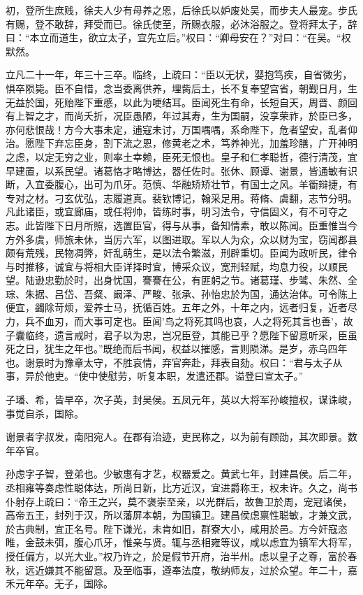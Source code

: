 \documentclass[12pt,UTF8]{ctexbook}
\begin{document}
初，登所生庶贱，徐夫人少有母养之恩，后徐氏以妒废处吴，而步夫人最宠。步氏有赐，登不敢辞，拜受而已。徐氏使至，所赐衣服，必沐浴服之。登将拜太子，辞曰：“本立而道生，欲立太子，宜先立后。”权曰：“卿母安在？”对曰：“在吴。“权默然。

立凡二十一年，年三十三卒。临终，上疏曰：“臣以无状，婴抱笃疾，自省微劣，惧卒陨毙。臣不自惜，念当委离供养，埋胔后土，长不复奉望宫省，朝觐日月，生无益於国，死贻陛下重慼，以此为哽结耳。臣闻死生有命，长短自天，周晋、颜回有上智之才，而尚夭折，况臣愚陋，年过其寿，生为国嗣，没享荣祚，於臣已多，亦何悲恨哉！方今大事未定，逋寇未讨，万国喁喁，系命陛下，危者望安，乱者仰治。愿陛下弃忘臣身，割下流之恩，修黄老之术，笃养神光，加羞珍膳，广开神明之虑，以定无穷之业，则率土幸赖，臣死无恨也。皇子和仁孝聪哲，德行清茂，宜早建置，以系民望。诸葛恪才略博达，器任佐时。张休、顾谭、谢景，皆通敏有识断，入宜委腹心，出可为爪牙。范慎、华融矫矫壮节，有国士之风。羊衟辩捷，有专对之材。刁玄优弘，志履道真。裴钦博记，翰采足用。蒋脩、虞翻，志节分明。凡此诸臣，或宜廊庙，或任将帅，皆练时事，明习法令，守信固义，有不可夺之志。此皆陛下日月所照，选置臣官，得与从事，备知情素，敢以陈闻。臣重惟当今方外多虞，师旅未休，当厉六军，以图进取。军以人为众，众以财为宝，窃闻郡县颇有荒残，民物凋弊，奸乱萌生，是以法令繁滋，刑辟重切。臣闻为政听民，律令与时推移，诚宜与将相大臣详择时宜，博采众议，宽刑轻赋，均息力役，以顺民望。陆逊忠勤於时，出身忧国，謇謇在公，有匪躬之节。诸葛瑾、步骘、朱然、全琮、朱据、吕岱、吾粲、阚泽、严畯、张承、孙怡忠於为国，通达治体。可令陈上便宜，蠲除苛烦，爱养士马，抚循百姓。五年之外，十年之内，远者归复，近者尽力，兵不血刃，而大事可定也。臣闻'鸟之将死其鸣也哀，人之将死其言也善'，故子囊临终，遗言戒时，君子以为忠，岂况臣登，其能已乎？愿陛下留意听采，臣虽死之日，犹生之年也。”既绝而后书闻，权益以摧感，言则陨涕。是岁，赤乌四年也。谢景时为豫章太守，不胜哀情，弃官奔赴，拜表自劾。权曰：“君与太子从事，异於他吏。“使中使慰劳，听复本职，发遣还郡。谥登曰宣太子。”

子璠、希，皆早卒，次子英，封吴侯。五凤元年，英以大将军孙峻擅权，谋诛峻，事觉自杀，国除。

谢景者字叔发，南阳宛人。在郡有治迹，吏民称之，以为前有顾劭，其次即景。数年卒官。

孙虑字子智，登弟也。少敏惠有才艺，权器爱之。黄武七年，封建昌侯。后二年，丞相雍等奏虑性聪体达，所尚日新，比方近汉，宜进爵称王，权未许。久之，尚书仆射存上疏曰：“帝王之兴，莫不褒崇至亲，以光群后，故鲁卫於周，宠冠诸侯，高帝五王，封列于汉，所以藩屏本朝，为国镇卫。建昌侯虑禀性聪敏，才兼文武，於古典制，宜正名号。陛下谦光，未肯如旧，群寮大小，咸用於邑。方今奸寇恣睢，金鼓未弭，腹心爪牙，惟亲与贤。辄与丞相雍等议，咸以虑宜为镇军大将军，授任偏方，以光大业。”权乃许之，於是假节开府，治半州。虑以皇子之尊，富於春秋，远近嫌其不能留意。及至临事，遵奉法度，敬纳师友，过於众望。年二十，嘉禾元年卒。无子，国除。
\end{document}
